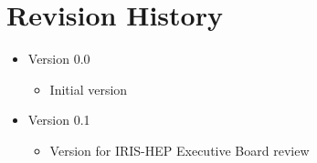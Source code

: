 \documentclass[11pt,letterpaper,fleqn]{article}
\begin{document}
\appendix
\newpage
\section{Revision History}

\vspace{8pt}
\begin{itemize}
  \item Version 0.0
  \vspace{-5pt}
  \begin{itemize}
    \item Initial version
  \end{itemize}
  \item Version 0.1
  \vspace{-5pt}
  \begin{itemize}
    \item Version for IRIS-HEP Executive Board review
  \end{itemize}
\end{itemize}
\end{document}

